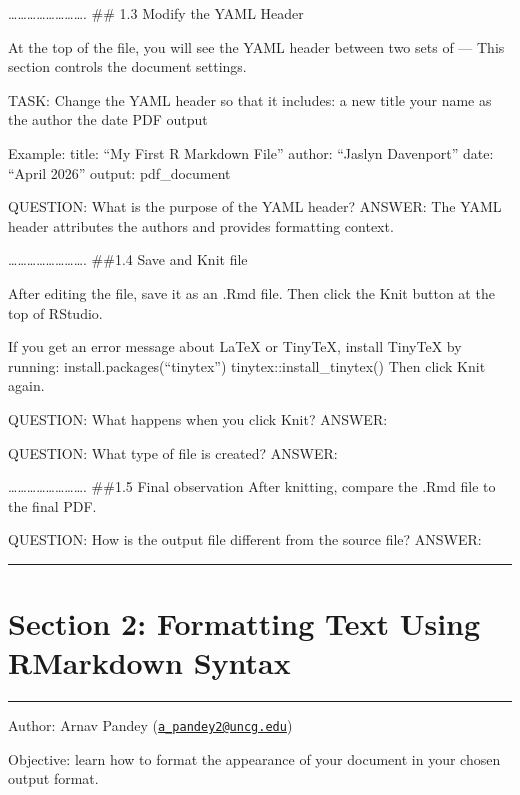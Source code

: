 \documentclass[
]{article}
\begin{document}
\ldots\ldots\ldots\ldots\ldots\ldots\ldots\ldots. \#\# 1.3 Modify the
YAML Header

At the top of the file, you will see the YAML header between two sets of
--- This section controls the document settings.

TASK: Change the YAML header so that it includes: a new title your name
as the author the date PDF output

Example: title: ``My First R Markdown File'' author: ``Jaslyn
Davenport'' date: ``April 2026'' output: pdf\_document

QUESTION: What is the purpose of the YAML header? ANSWER: The YAML
header attributes the authors and provides formatting context.

\ldots\ldots\ldots\ldots\ldots\ldots\ldots\ldots. \#\#1.4 Save and Knit
file

After editing the file, save it as an .Rmd file. Then click the Knit
button at the top of RStudio.

If you get an error message about LaTeX or TinyTeX, install TinyTeX by
running: install.packages(``tinytex'') tinytex::install\_tinytex() Then
click Knit again.

QUESTION: What happens when you click Knit? ANSWER:

QUESTION: What type of file is created? ANSWER:

\ldots\ldots\ldots\ldots\ldots\ldots\ldots\ldots. \#\#1.5 Final
observation After knitting, compare the .Rmd file to the final PDF.

QUESTION: How is the output file different from the source file? ANSWER:

\begin{center}\rule{0.5\linewidth}{0.5pt}\end{center}

\section{Section 2: Formatting Text Using RMarkdown
Syntax}\label{section-2-formatting-text-using-rmarkdown-syntax}

\begin{center}\rule{0.5\linewidth}{0.5pt}\end{center}

Author: Arnav Pandey
(\href{mailto:a_pandey2@uncg.edu}{\nolinkurl{a\_pandey2@uncg.edu}})

Objective: learn how to format the appearance of your document in your
chosen output format.
\end{document}
